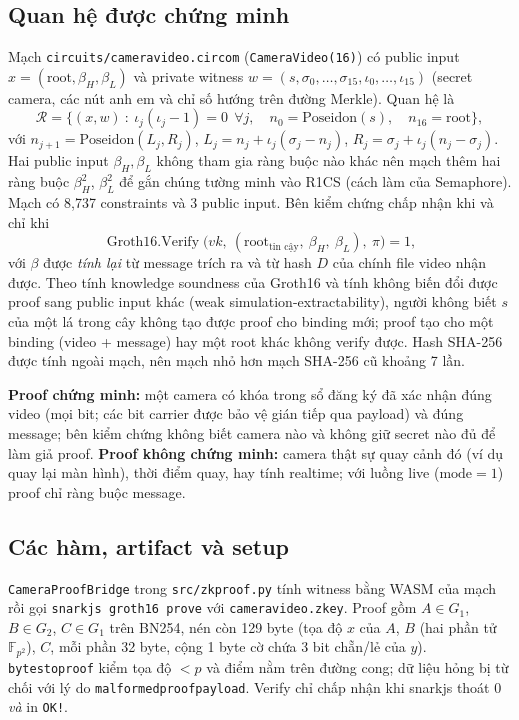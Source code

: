 \documentclass[11pt,a4paper]{article}
\renewcommand{\_}{\origunderscore\allowbreak}
\begin{document}
\subsection{Quan hệ được chứng minh}
Mạch \texttt{circuits/camera\_video.circom} (\texttt{CameraVideo(16)}) có public input $x=(\mathrm{root},\beta_H,\beta_L)$ và private witness $w=(s,\sigma_0,\dots,\sigma_{15},\iota_0,\dots,\iota_{15})$ (secret camera, các nút anh em và chỉ số hướng trên đường Merkle). Quan hệ là
\[
\mathcal{R}=\Big\{(x,w)\ :\ \iota_j(\iota_j-1)=0\ \ \forall j,\quad n_0=\mathrm{Poseidon}(s),\quad n_{16}=\mathrm{root}\Big\},
\]
với $n_{j+1}=\mathrm{Poseidon}(L_j,R_j)$, $L_j=n_j+\iota_j(\sigma_j-n_j)$, $R_j=\sigma_j+\iota_j(n_j-\sigma_j)$. Hai public input $\beta_H,\beta_L$ không tham gia ràng buộc nào khác nên mạch thêm hai ràng buộc $\beta_H^2$, $\beta_L^2$ để gắn chúng tường minh vào R1CS (cách làm của Semaphore). Mạch có 8,737 constraints và 3 public input. Bên kiểm chứng chấp nhận khi và chỉ khi
\[
\operatorname{Groth16.Verify}\big(\mathit{vk},\ (\mathrm{root}_{\text{tin cậy}},\ \beta_H,\ \beta_L),\ \pi\big)=1,
\]
với $\beta$ được \emph{tính lại} từ message trích ra và từ hash $D$ của chính file video nhận được. Theo tính knowledge soundness của Groth16 và tính không biến đổi được proof sang public input khác (weak simulation-extractability), người không biết $s$ của một lá trong cây không tạo được proof cho binding mới; proof tạo cho một binding (video + message) hay một root khác không verify được. Hash SHA-256 được tính ngoài mạch, nên mạch nhỏ hơn mạch SHA-256 cũ khoảng 7 lần.

\textbf{Proof chứng minh:} một camera có khóa trong sổ đăng ký đã xác nhận đúng video (mọi bit; các bit carrier được bảo vệ gián tiếp qua payload) và đúng message; bên kiểm chứng không biết camera nào và không giữ secret nào đủ để làm giả proof. \textbf{Proof không chứng minh:} camera thật sự quay cảnh đó (ví dụ quay lại màn hình), thời điểm quay, hay tính realtime; với luồng live ($\mathrm{mode}=1$) proof chỉ ràng buộc message.

\subsection{Các hàm, artifact và setup}
\texttt{CameraProofBridge} trong \texttt{src/zk\_proof.py} tính witness bằng WASM của mạch rồi gọi \texttt{snarkjs groth16 prove} với \texttt{camera\_video.zkey}. Proof gồm $A\in G_1$, $B\in G_2$, $C\in G_1$ trên BN254, nén còn 129 byte (tọa độ $x$ của $A$, $B$ (hai phần tử $\mathbb{F}_{p^2}$), $C$, mỗi phần 32 byte, cộng 1 byte cờ chứa 3 bit chẵn/lẻ của $y$). \texttt{bytes\_to\_proof} kiểm tọa độ $<p$ và điểm nằm trên đường cong; dữ liệu hỏng bị từ chối với lý do \texttt{malformed\_proof\_payload}. Verify chỉ chấp nhận khi snarkjs thoát 0 \emph{và} in \texttt{OK!}.
\end{document}

